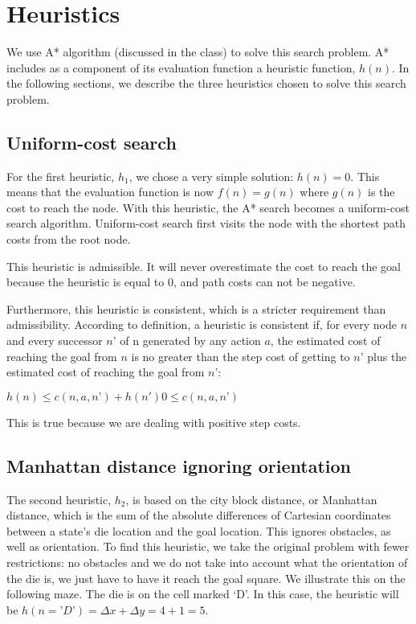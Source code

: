 \documentclass[]{article}
\begin{document}
\section{Heuristics}
We use A* algorithm (discussed in the class) to solve this search problem.
A* includes as a component of its evaluation function a heuristic function, $h(n)$.
In the following sections, we describe the three heuristics chosen to solve this search problem.

\subsection{Uniform-cost search}
For the first heuristic, $h_1$, we chose a very simple solution: $h(n) = 0$.
This means that the evaluation function is now $f(n) = g(n)$ where $g(n)$ is the cost to reach the node.
With this heuristic, the A* search becomes a uniform-cost search algorithm.
Uniform-cost search first visits the node with the shortest path costs from the root node.

This heuristic is admissible.
It will never overestimate the cost to reach the goal because the heuristic is equal to 0, and path costs can not be negative.

Furthermore, this heuristic is consistent, which is a stricter requirement than admissibility.
According to definition, a heuristic is consistent if, for every node $n$ and every successor $n’$ of n generated by any action $a$, the estimated cost of reaching the goal from $n$ is no greater than the step cost of getting to $n’$ plus the estimated cost of reaching the goal from $n’$:

$
h(n) \leq c(n,a,n’) + h(n')

0 \leq c(n,a,n’)
$

This is true because we are dealing with positive step costs.

\subsection{Manhattan distance ignoring orientation}
The second heuristic, $h_2$, is based on the city block distance, or Manhattan distance, which is the sum of the absolute differences of Cartesian coordinates between a state's die location and the goal location.  This ignores obstacles, as well as orientation.
To find this heuristic, we take the original problem with fewer restrictions: no obstacles and we do not take into account what the orientation of the die is, we just have to have it reach the goal square. 
We illustrate this on the following maze.
The die is on the cell marked ‘D’.
In this case, the heuristic will be $h(n=’D’) = \Delta x + \Delta y = 4+1 = 5$.
\end{document}
